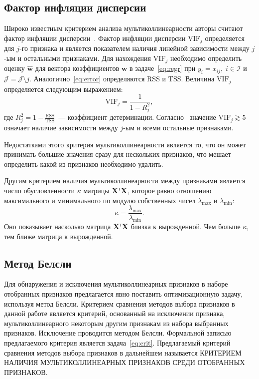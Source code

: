 \documentclass[a4paper,12pt]{article}
\newcommand{\bw}{\mathbf{w}}
\newcommand{\bX}{\mathbf{X}}
\newcommand{\calJ}{\mathcal{J}}
\newcommand{\calI}{\mathcal{I}}
\newcommand{\vif}{\mathrm{VIF}}
\newcommand{\rss}{\mathrm{RSS}}
\newcommand{\tss}{\mathrm{TSS}}
\newcommand{\T}{{\text{\tiny\sffamily\upshape\mdseries T}}}
\theoremstyle{plain}
\begin{document}
\subsection{Фактор инфляции дисперсии}
Широко известным критерием анализа мультиколлинеарности авторы считают фактор инфляции дисперсии~\cite{multCausesEffectsRemedies}.  
Фактор инфляции дисперсии $\vif_j$ определяется для $j$-го признака и является показателем наличия линейной зависимости между $j$-ым и остальными признаками. Для нахождения $\vif_j$ необходимо определить оценку $\hat{\bw}$ для вектора коэффициентов $\bw$ в задаче~\eqref{eq:regr} при $y_i = x_{ij}, \; i \in \calI$ и $\calJ = \calJ \setminus j$. Аналогично~\eqref{eq:error} определяются $\rss$ и $\tss$.
Величина $\vif_j$ определяется следующим выражением:
\begin{equation*}
\vif_j = \frac{1}{1 - R^2_j},
\label{eq:vif}
\end{equation*}     
где $R^2_j = 1 - \frac{\rss}{\tss}$~--- коэффициент детерминации. Согласно~\cite{multCausesEffectsRemedies}  значение $\vif_j \gtrsim 5 $ означает наличие зависимости между $j$-ым и всеми остальные признаками.

Недостатками этого критерия мультиколлинеарности является то, что он может принимать большие значения сразу для нескольких признаков, что мешает определить какой из признаков необходимо удалить.   

Другим критерием наличия мультиколлинеарности между признаками является число обусловленности $\kappa$ матрицы $\bX^{\T}\bX$, которое равно отношению максимального и минимального по модулю собственных чисел $\lambda_{\mathrm{max}}$ и $\lambda_{\mathrm{min}}$:
\begin{equation*}
\kappa = \frac{\lambda_{\mathrm{max}}}{\lambda_{\mathrm{min}}}.
\label{eq:condnum}
\end{equation*} 
Оно показывает насколько матрица $\bX^{\T}\bX$ близка к вырожденной. Чем больше $\kappa$, тем ближе матрица к вырожденной.   

\subsection{Метод Белсли}
Для обнаружения и исключения мультиколлинеарных признаков в наборе отобранных признаков предлагается явно поставить оптимизационную задачу, используя метод Белсли. Критерием сравнения методов выбора признаков в данной работе является критерий, основанный на исключении признака, мультиколлинеарного некоторым другим признакам из набора выбранных признаков. Исключение проводится методом Белсли. Формальной записью предлагаемого критерия является задача~\eqref{eq:crit}. Предлагаемый критерий сравнения методов выбора признаков в дальнейшем называется КРИТЕРИЕМ НАЛИЧИЯ МУЛЬТИКОЛЛИНЕАРНЫХ ПРИЗНАКОВ СРЕДИ ОТОБРАННЫХ ПРИЗНАКОВ.  
\end{document}
